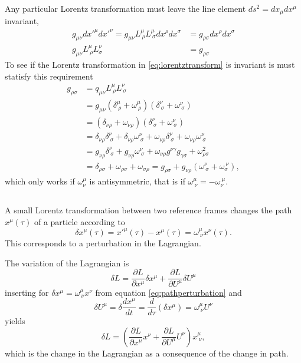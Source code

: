 \documentclass[11pt]{amsart}
\begin{document}
Any particular Lorentz transformation must leave the line element $ds^2 = dx_{\mu}dx^{\mu}$ invariant,
\begin{align*}
g_{\mu\nu}dx'^{\mu}dx'^{\nu} = g_{\mu\nu} L^\mu_{\ \rho} L^\mu_{\ \sigma}dx^\rho dx^\sigma 
											&= g_{\rho\sigma}dx^\rho dx^\sigma \\
g_{\mu\nu}L^{\mu}_{\ \rho}L^{\nu}_{\sigma}	&= g_{\rho\sigma}
\end{align*}
To see if the Lorentz transformation in \ref{eq:lorentztransform} is invariant is must statisfy this requirement
\begin{align*}
g_{\rho\sigma}  &= q_{\mu\nu}L^{\mu}_{\ \rho}L^{\nu}_{\ \sigma} \\
			&= g_{\mu\nu}(\delta^{\mu}_{\ \rho} + \omega^{\mu}_{\ \rho})(\delta^{\nu}_{\ \sigma} + \omega^{\nu}_{\ \sigma}) \\
			&= (\delta_{\nu\rho} + \omega_{\nu\rho})(\delta^{\nu}_{\ \sigma} + \omega^{\nu}_{\ \sigma}) \\
			&= \delta_{\nu\rho}\delta^{\nu}_{\ \sigma} + \delta_{\nu\rho}\omega^{\nu}_{\ \sigma} + \omega_{\nu\rho}\delta^{\nu}_{\ \sigma} + \omega_{\nu\rho}\omega^{\nu}_{\ \sigma} \\
			&= g_{\nu\rho}\delta^{\nu}_{\ \sigma} + g_{\nu\rho}\omega^{\nu}_{\ \sigma} + \omega_{\nu\rho}g^{\nu\gamma} g_{\gamma\sigma} + \omega^2_{\rho\sigma} \\
			& = \delta_{\rho\sigma} + \omega_{\rho\sigma} + \omega_{\sigma\rho} = g_{\rho\sigma} + g_{\nu\rho}(\omega^{\nu}_{\ \sigma} + \omega_{\sigma}^{\ \nu}),
\end{align*}
which only works if $\omega^{\mu}_{\nu}$ is antisymmetric, that is if $\omega^{\mu}_{\ \nu} = -\omega_{\nu}^{\ \mu}$.

\subsection{}
A small Lorentz transformation between two reference frames changes the path $x^\mu(\tau)$ of a particle according to
\begin{equation}
\label{eq:pathperturbation}
\delta x^\mu(\tau) = x'^\mu(\tau) - x^\mu(\tau) = \omega^\mu_{\ \nu}x^\nu(\tau).
\end{equation}
This corresponds to a perturbation in the Lagrangian.

The variation of the Lagrangian is
\begin{equation*}
\delta L = \frac{\partial L}{\partial x^\mu} \delta x^\mu + \frac{\partial L}{\partial U^\mu} \delta U^\mu
\end{equation*}
inserting for $\delta x^\mu = \omega^\mu_{\ \nu} x^\nu$ from equation \ref{eq:pathperturbation} and 
\begin{equation*}
\delta U^\mu = \delta \frac{d x^\mu}{d t} = \frac{d}{d\tau}(\delta x^\mu) = \omega^\mu_{\ \nu}U^\nu 
\end{equation*} 
yields
\begin{equation}
\label{eq:lagrangeperturbartion}
\delta L = \left(\frac{\partial L}{\partial x^\mu}x^\nu + \frac{\partial L}{\partial U^\mu}U^\nu \right)x^\mu_{\ \nu},
\end{equation}
which is the change in the Lagrangian as a consequence of the change in path.
\end{document}
